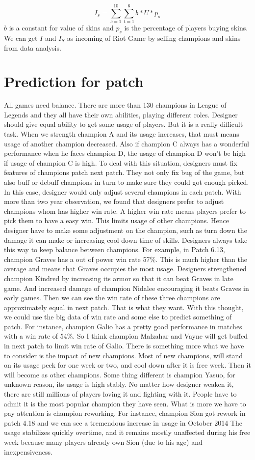 \documentclass[sigconf]{acmart}
\begin{document}
\begin{equation}
    I_s=\sum_{c=1}^{10}\sum_{t=1}^6b*U*p_s
\end{equation}
$b$ is a constant for value of skins and $p_s$ is the percentage of players buying skins. We can get $I$ and $I_S$ as incoming of Riot Game by selling champions and skins from data analysis.
\section{Prediction for patch}
All games need balance. There are more than 130 champions in League of Legends and they all have their own abilities, playing different roles. Designer should give equal ability to get some usage of players. But it is a really difficult task. When we strength champion A and its usage increases, that must means usage of another champion decreased. Also if champion C always has a wonderful performance when he faces champion D, the usage of champion D won't be high if usage of champion C is high. To deal with this situation, designers must fix features of champions patch next patch. They not only fix bug of the game, but also buff or debuff champions  in turn to make sure they could got enough picked. In this case, designer would only adjust several champions in each patch. With more than two year observation, we found that designers prefer to adjust champions whom has higher win rate. A higher win rate means players prefer to pick them to have a easy win. This limits usage of other champions. Hence designer have to make some adjustment on the champion, such as turn down the damage it can make or increasing cool down time of skills. Designers always take this way to keep balance between champions. For example, in Patch 6.13, champion Graves has a out of power win rate 57\%. This is much higher than the average and means that Graves occupies the most usage. Designers strengthened champion Kindred by increasing its armor so that it can beat Graves in late game. And increased damage of champion Nidalee encouraging it beats Graves in early games. Then we can see the win rate of these three champions are approximately equal in next patch. That is what they want. With this thought, we could use the big data of win rate and some else to predict something of patch. For instance, champion Galio has a pretty good performance in matches with a win rate of 54\%. So I think champion Malzahar and Vayne will get buffed in next patch to limit win rate of Galio. There is something more what we have to consider is the impact of new champions. Most of new champions, will stand on its usage peek for one week or two, and cool down after it is free week. Then it will become as other champions. Some thing different is champion Yasuo, for unknown reason, its usage is high stably. No matter how designer weaken it, there are still millions of players loving it and fighting with it. People have to admit it is the most popular champion they have seen. What is more we have to pay attention is champion reworking. For instance, champion Sion got rework in patch 4.18 and we can see a tremendous increase in usage in October 2014  The usage stabilizes quickly overtime, and it remains mostly unaffected during his free week because many players already own Sion (due to his age) and inexpensiveness. \cite{aaa}
\end{document}
